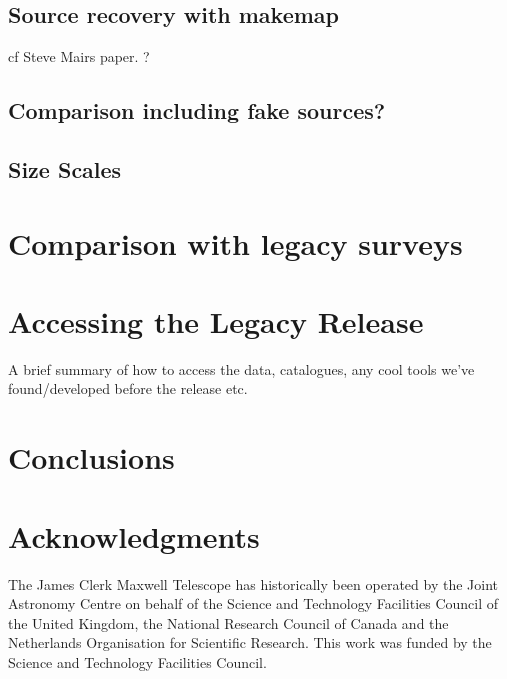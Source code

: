 \documentclass[usenatbib]{mn2e}
\begin{document}
\subsection{Source recovery with makemap}
cf Steve Mairs paper. \citep{2014ApJ...783...60M} ?

\subsection{Comparison including fake sources?}

\subsection{Size Scales}

\section{Comparison with legacy surveys}

\section{Accessing the Legacy Release}
A brief summary of how to access the data, catalogues, any cool tools
we've found/developed before the release etc.

\section{Conclusions}

\section*{Acknowledgments}

The James Clerk Maxwell Telescope has historically been operated by
the Joint Astronomy Centre on behalf of the Science and Technology
Facilities Council of the United Kingdom, the National Research
Council of Canada and the Netherlands Organisation for Scientific
Research. This work was funded by the Science and Technology Facilities
Council.



\end{document}
